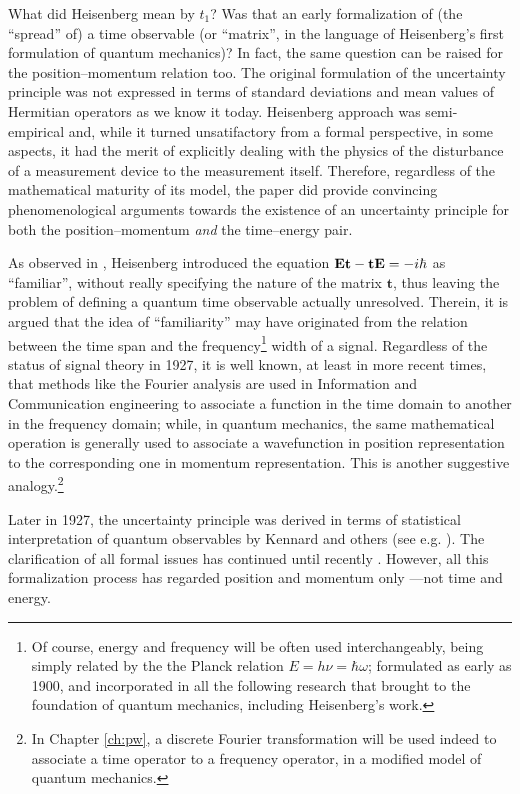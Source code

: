 What did Heisenberg mean by $t_1$? Was that an early formalization of (the ``spread'' of)
a time observable (or ``matrix'', in the language of Heisenberg's first formulation of quantum mechanics)?
In fact, the same question can be raised for the position--momentum
relation too. The original formulation of the uncertainty principle
was not expressed in terms of standard deviations and mean values of Hermitian operators
as we know it today. Heisenberg approach was semi-empirical and,
while it turned unsatifactory from a formal perspective, in some aspects,
it had the merit of explicitly dealing with the physics of the disturbance
of a measurement device to the measurement itself. Therefore,
regardless of the mathematical maturity of its model,
the paper did provide convincing phenomenological arguments towards
the existence of an uncertainty principle for both the position--momentum
\emph{and} the time--energy pair.

As observed in \cite[.3]{TQM1}, Heisenberg introduced the equation
$\mathbf{Et}-\mathbf{tE} = -i\hbar$
as ``familiar'', without really specifying the nature of the matrix $\mathbf{t}$,
thus leaving the problem of defining a quantum time observable actually unresolved.
Therein, it is argued that the idea of ``familiarity'' may have originated from the
relation between
the time span and the frequency\footnote{
  Of course, energy and frequency will be often used interchangeably,
  being
  simply related by the the Planck relation $E = h\nu = \hbar\omega$;
  formulated as early as 1900, and incorporated in all the following research
  that brought to the foundation of quantum mechanics, including Heisenberg's work.
}
width of a signal. Regardless of the status
of signal theory in 1927, it is well known, at least in more recent times, that
methods like the Fourier analysis are used in Information and Communication engineering to associate a function in the time domain
to another in the frequency domain; while, in quantum mechanics, the same mathematical operation
is generally used to associate a wavefunction in position representation to
the corresponding one in momentum representation.
This is another suggestive analogy.\footnote{
  In Chapter \ref{ch:pw}, a discrete Fourier transformation will be used indeed to
  associate a time operator to a frequency operator,
  in a modified model of quantum mechanics.
}

Later in 1927, the uncertainty principle was derived in terms of
statistical interpretation of quantum observables
by Kennard and others (see e.g. \cite{Kennard1927}).
The clarification of all formal issues has continued until recently \parencite{Appleby}.
However, all this formalization process has regarded position and momentum only
---not time and energy.

